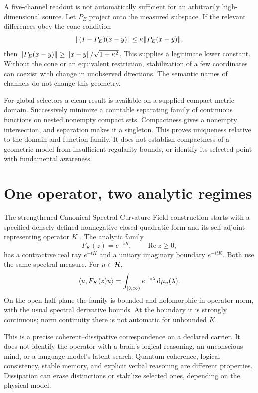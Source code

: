 A five-channel readout is not automatically sufficient for an arbitrarily high-dimensional source. Let $P_E$ project onto the measured subspace. If the relevant differences obey the cone condition
\[
\lVert (I-P_E)(x-y)\rVert\le\kappa\lVert P_E(x-y)\rVert,
\]
then $\lVert P_E(x-y)\rVert\ge\lVert x-y\rVert/\sqrt{1+\kappa^2}$. This supplies a legitimate lower constant. Without the cone or an equivalent restriction, stabilization of a few coordinates can coexist with change in unobserved directions. The semantic names of channels do not change this geometry.

For global selectors a clean result is available on a supplied compact metric domain. Successively minimize a countable separating family of continuous functions on nested nonempty compact sets. Compactness gives a nonempty intersection, and separation makes it a singleton. This proves uniqueness relative to the domain and function family. It does not establish compactness of a geometric model from insufficient regularity bounds, or identify its selected point with fundamental awareness.

\section{One operator, two analytic regimes}\label{section:cscf:one-operator-two-analytic-regimes}
The strengthened Canonical Spectral Curvature Field construction starts with a specified densely defined nonnegative closed quadratic form and its self-adjoint representing operator $K$ \cite{RodgersCSCF}. The analytic family
\begin{equation}\label{eq:cscf}
F_K(z)=e^{-zK},\qquad \operatorname{Re}z\ge0,
\end{equation}
has a contractive real ray $e^{-tK}$ and a unitary imaginary boundary $e^{-itK}$. Both use the same spectral measure. For $u\in\mathcal H$,
\[
\langle u,F_K(z)u\rangle=\int_{[0,\infty)}e^{-z\lambda}\,\mathrm d\mu_u(\lambda).
\]
On the open half-plane the family is bounded and holomorphic in operator norm, with the usual spectral derivative bounds. At the boundary it is strongly continuous; norm continuity there is not automatic for unbounded $K$.

This is a precise coherent--dissipative correspondence on a declared carrier. It does not identify the operator with a brain's logical reasoning, an unconscious mind, or a language model's latent search. Quantum coherence, logical consistency, stable memory, and explicit verbal reasoning are different properties. Dissipation can erase distinctions or stabilize selected ones, depending on the physical model.


